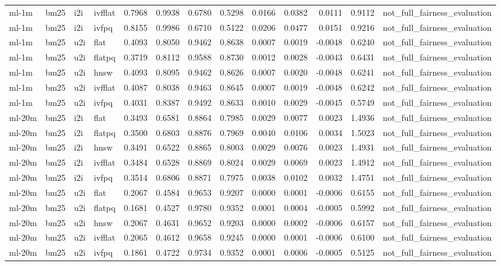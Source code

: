\begin{tabular}{llllrrrrrrrrl}
ml-1m & bm25 & i2i & ivfflat & 0.7968 & 0.9938 & 0.6780 & 0.5298 & 0.0166 & 0.0382 & 0.0111 & 0.9112 & not_full_fairness_evaluation \\
ml-1m & bm25 & i2i & ivfpq & 0.8155 & 0.9986 & 0.6710 & 0.5122 & 0.0206 & 0.0477 & 0.0151 & 0.9216 & not_full_fairness_evaluation \\
ml-1m & bm25 & u2i & flat & 0.4093 & 0.8050 & 0.9462 & 0.8638 & 0.0007 & 0.0019 & -0.0048 & 0.6240 & not_full_fairness_evaluation \\
ml-1m & bm25 & u2i & flatpq & 0.3719 & 0.8112 & 0.9588 & 0.8730 & 0.0012 & 0.0028 & -0.0043 & 0.6431 & not_full_fairness_evaluation \\
ml-1m & bm25 & u2i & hnsw & 0.4093 & 0.8095 & 0.9462 & 0.8626 & 0.0007 & 0.0020 & -0.0048 & 0.6241 & not_full_fairness_evaluation \\
ml-1m & bm25 & u2i & ivfflat & 0.4087 & 0.8038 & 0.9463 & 0.8645 & 0.0007 & 0.0019 & -0.0048 & 0.6242 & not_full_fairness_evaluation \\
ml-1m & bm25 & u2i & ivfpq & 0.4031 & 0.8387 & 0.9492 & 0.8633 & 0.0010 & 0.0029 & -0.0045 & 0.5749 & not_full_fairness_evaluation \\
ml-20m & bm25 & i2i & flat & 0.3493 & 0.6581 & 0.8864 & 0.7985 & 0.0029 & 0.0077 & 0.0023 & 1.4936 & not_full_fairness_evaluation \\
ml-20m & bm25 & i2i & flatpq & 0.3500 & 0.6803 & 0.8876 & 0.7969 & 0.0040 & 0.0106 & 0.0034 & 1.5023 & not_full_fairness_evaluation \\
ml-20m & bm25 & i2i & hnsw & 0.3491 & 0.6522 & 0.8865 & 0.8003 & 0.0029 & 0.0076 & 0.0023 & 1.4931 & not_full_fairness_evaluation \\
ml-20m & bm25 & i2i & ivfflat & 0.3484 & 0.6528 & 0.8869 & 0.8024 & 0.0029 & 0.0069 & 0.0023 & 1.4912 & not_full_fairness_evaluation \\
ml-20m & bm25 & i2i & ivfpq & 0.3514 & 0.6806 & 0.8871 & 0.7975 & 0.0038 & 0.0102 & 0.0032 & 1.4751 & not_full_fairness_evaluation \\
ml-20m & bm25 & u2i & flat & 0.2067 & 0.4584 & 0.9653 & 0.9207 & 0.0000 & 0.0001 & -0.0006 & 0.6155 & not_full_fairness_evaluation \\
ml-20m & bm25 & u2i & flatpq & 0.1681 & 0.4527 & 0.9780 & 0.9352 & 0.0001 & 0.0004 & -0.0005 & 0.5992 & not_full_fairness_evaluation \\
ml-20m & bm25 & u2i & hnsw & 0.2067 & 0.4631 & 0.9652 & 0.9203 & 0.0000 & 0.0002 & -0.0006 & 0.6157 & not_full_fairness_evaluation \\
ml-20m & bm25 & u2i & ivfflat & 0.2065 & 0.4612 & 0.9658 & 0.9245 & 0.0000 & 0.0001 & -0.0006 & 0.6100 & not_full_fairness_evaluation \\
ml-20m & bm25 & u2i & ivfpq & 0.1861 & 0.4722 & 0.9734 & 0.9352 & 0.0001 & 0.0006 & -0.0005 & 0.5125 & not_full_fairness_evaluation \\
\bottomrule
\end{tabular}
